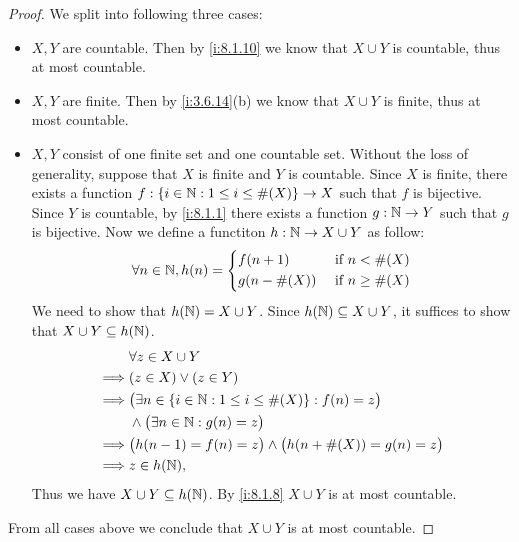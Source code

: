 \begin{proof}
  We split into following three cases:
  \begin{itemize}
    \item \(X, Y\) are countable.
          Then by \cref{i:8.1.10} we know that \(X \cup Y\) is countable, thus at most countable.
    \item \(X, Y\) are finite.
          Then by \cref{i:3.6.14}(b) we know that \(X \cup Y\) is finite, thus at most countable.
    \item \(X, Y\) consist of one finite set and one countable set.
          Without the loss of generality, suppose that \(X\) is finite and \(Y\) is countable.
          Since \(X\) is finite, there exists a function \(f : \left\lbrace i \in \mathbb{N} : 1 \leq i \leq \#(X)\right\rbrace \to X\) such that \(f\) is bijective.
          Since \(Y\) is countable, by \cref{i:8.1.1} there exists a function \(g : \mathbb{N} \to Y\) such that \(g\) is bijective.
          Now we define a functiton \(h : \mathbb{N} \to X \cup Y\) as follow:
          \[
            \forall n \in \mathbb{N}, h(n) = \begin{dcases}
              f(n + 1)     & \text{ if } n < \#(X)    \\
              g(n - \#(X)) & \text{ if } n \geq \#(X)
            \end{dcases}
          \]
          We need to show that \(h(\mathbb{N}) = X \cup Y\).
          Since \(h(\mathbb{N}) \subseteq X \cup Y\), it suffices to show that \(X \cup Y \subseteq h(\mathbb{N})\).
          \begin{align*}
                     & \forall z \in X \cup Y                                                  \\
            \implies & (z \in X) \lor (z \in Y)                                                \\
            \implies & \big(\exists n \in \left\lbrace i \in \mathbb{N} : 1 \leq i \leq \#(X)\right\rbrace : f(n) = z\big) \\
                     & \land \big(\exists n \in \mathbb{N} : g(n) = z\big)                             \\
            \implies & \big(h(n - 1) = f(n) = z\big) \land \big(h(n + \#(X)) = g(n) = z\big)   \\
            \implies & z \in h(\mathbb{N}),
          \end{align*}
          Thus we have \(X \cup Y \subseteq h(\mathbb{N})\).
          By \cref{i:8.1.8} \(X \cup Y\) is at most countable.
  \end{itemize}
  From all cases above we conclude that \(X \cup Y\) is at most countable.
\end{proof}

